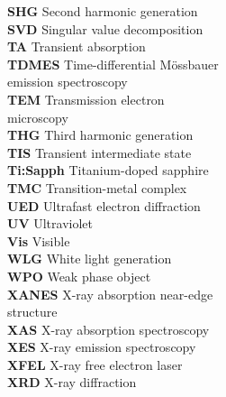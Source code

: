 \documentclass[12pt]{ut-thesis}
\begin{document}
\begin{preliminary}
\begin{multicols}{2}
\begin{tabbing}
      \textbf{SHG} \> Second harmonic generation \\
      \textbf{SVD} \> Singular value decomposition \\
      \textbf{TA} \> Transient absorption \\
      \textbf{TDMES} \> Time-differential M\"{o}ssbauer \\
        \> emission spectroscopy \\
      \textbf{TEM} \> Transmission electron \\
        \> microscopy\\
      \textbf{THG} \> Third harmonic generation\\
      \textbf{TIS} \> Transient intermediate state\\
      \textbf{Ti:Sapph} \> Titanium-doped sapphire \\
      \textbf{TMC} \> Transition-metal complex\\
      \textbf{UED} \> Ultrafast electron diffraction\\
      \textbf{UV} \> Ultraviolet\\
      \textbf{Vis} \> Visible\\
      \textbf{WLG} \> White light generation\\
      \textbf{WPO} \> Weak phase object\\
      \textbf{XANES} \> X-ray absorption near-edge \\
        \> structure\\
      \textbf{XAS} \> X-ray absorption spectroscopy \\
      \textbf{XES} \> X-ray emission spectroscopy \\
      \textbf{XFEL} \> X-ray free electron laser \\
      \textbf{XRD} \> X-ray diffraction
    \end{tabbing}
    \end{multicols}

  \end{preliminary}

  \raggedbottom%

  
  
  
  
  
  
  

  \appendix
  
  
  
  
  
  
  
  
  
  
  
  
  


\end{document}

